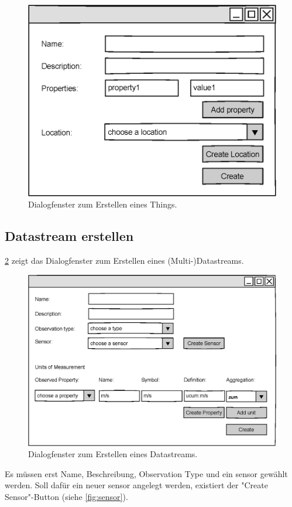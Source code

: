 \documentclass[a4paper, 12 pt]{article}
\begin{document}
\begin{figure}[htbp]
\centering
\includegraphics[scale=0.8]{images/thing}
\caption{\label{fig:thing}Dialogfenster zum Erstellen eines Things.}
\end{figure}


\subsection{Datastream erstellen}
\cref{fig:ds} zeigt das Dialogfenster zum Erstellen eines (Multi-)Datastreams. 
\begin{figure}[htbp]
\centering
\includegraphics[scale=0.8]{images/datastream}
\caption{\label{fig:ds}Dialogfenster zum Erstellen eines Datastreams.}
\end{figure}
Es müssen erst Name, Beschreibung, Observation Type und ein \gls{sensor} gewählt werden. Soll dafür ein neuer \gls{sensor} angelegt werden, existiert der "{Create Sensor}"{-Button} (siehe \cref{fig:sensor}).\\
\end{document}
